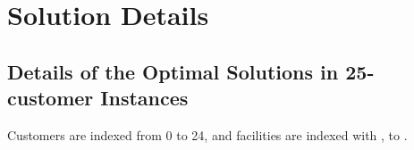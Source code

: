 \chapter{Solution Details}
\section{Details of the Optimal Solutions in 25-customer Instances}
\label{app:25customerSolutions}
Customers are indexed from 0 to 24, and facilities are indexed with 
\ta, to \te.

